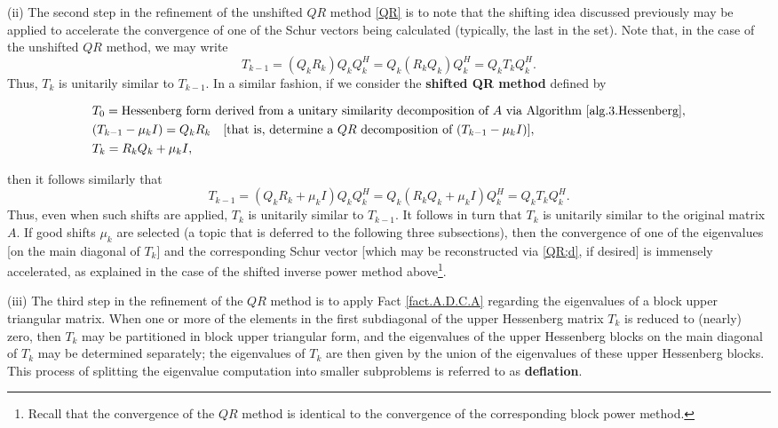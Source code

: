 \noindent (ii)
The second step in the refinement of the unshifted $QR$ method \eqref{QR} is to note that the shifting idea discussed previously may be applied to
accelerate the convergence of one of the Schur vectors being calculated (typically, the last in the set).  
Note that, in the case of the unshifted $QR$ method, we may write
\begin{equation*}
  T_{k-1} = (Q_k R_k) Q_k Q_k^H = Q_k (R_k Q_k) Q_k^H = Q_k T_k Q_k^H.
\end{equation*}
Thus, $T_k$ is unitarily similar to $T_{k-1}$.  In a similar fashion, if we consider the {\bf shifted QR method} defined by
\begin{subeqnA}
\label{shQR}
\begin{align}
& T_{0}= \textrm{Hessenberg form derived from a unitary similarity decomposition of $A$ via Algorithm \ref{alg.3.Hessenberg}}, \label{shQR;a}\\
& (T_{k-1}-\mu_k I) = {Q}_{k} {R}_{k} \quad \textrm{[that is, determine a $QR$ decomposition of $(T_{k-1}-\mu_k I)$]},\label{shQR;b}\\
& T_{k} = {R}_{k} {Q}_{k} + \mu_k I,\label{shQR;c}
\end{align}
\end{subeqnA}
then it follows similarly that
\begin{equation}
  T_{k-1} = (Q_k R_k + \mu_k I) Q_k Q_k^H = Q_k (R_k Q_k + \mu_k I) Q_k^H = Q_k T_k Q_k^H.
\label{eq:shQRsingle}
\end{equation}
Thus, even when such shifts are applied, $T_k$ is unitarily similar to $T_{k-1}$.  It follows in turn that $T_k$ is unitarily similar to the original matrix $A$.
If good shifts $\mu_k$ are selected (a topic that is deferred to the following three subsections),
then the convergence of one of the eigenvalues [on the main diagonal of $T_k$] and the corresponding Schur vector
[which may be reconstructed via \eqref{QR;d}, if desired] is immensely accelerated,
as explained in the case of the shifted inverse power method above\footnote{Recall that the convergence of the $QR$ method is identical to the convergence of the
corresponding block power method.}.\vskip0.1in

\noindent (iii)
The third step in the refinement of the $QR$ method is to apply Fact \ref{fact.A.D.C.A} regarding the eigenvalues of a block upper triangular matrix.
When one or more of the elements in the first subdiagonal of the upper Hessenberg matrix $T_{k}$ is reduced to (nearly) zero, then $T_{k}$ may be partitioned in
block upper triangular form, and the eigenvalues of the upper Hessenberg blocks on the main diagonal of $T_{k}$ may be determined separately; the eigenvalues
of $T_{k}$ are then given by the union of the eigenvalues of these upper Hessenberg blocks.  This process of splitting the eigenvalue computation
into smaller subproblems is referred to as {\bf deflation}.

